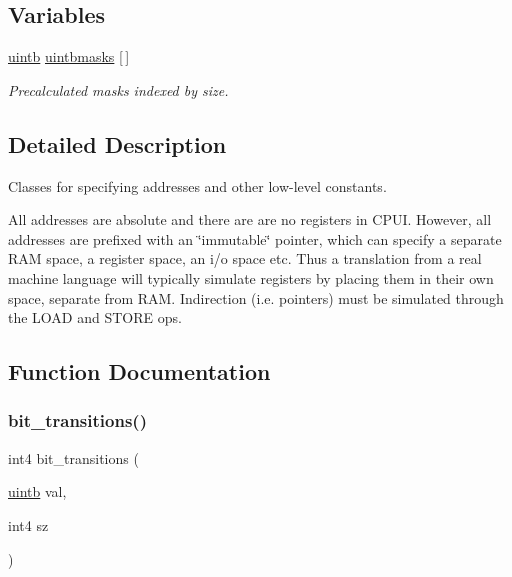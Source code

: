 \subsection*{Variables}
\begin{DoxyCompactItemize}
\item 
\mbox{\hyperlink{types_8h_a2db313c5d32a12b01d26ac9b3bca178f}{uintb}} \mbox{\hyperlink{address_8hh_af65db839ac7c389dab6cba2187c2e867}{uintbmasks}} \mbox{[}$\,$\mbox{]}
\begin{DoxyCompactList}\small\item\em Precalculated masks indexed by size. \end{DoxyCompactList}\end{DoxyCompactItemize}


\subsection{Detailed Description}
Classes for specifying addresses and other low-\/level constants. 

All addresses are absolute and there are are no registers in C\+P\+UI. However, all addresses are prefixed with an \char`\"{}immutable\char`\"{} pointer, which can specify a separate R\+AM space, a register space, an i/o space etc. Thus a translation from a real machine language will typically simulate registers by placing them in their own space, separate from R\+AM. Indirection (i.\+e. pointers) must be simulated through the L\+O\+AD and S\+T\+O\+RE ops. 

\subsection{Function Documentation}
\mbox{\label{address_8hh_a9971349a0c8643a0f9d1211f2e6aa3c0}} 
\subsubsection{\texorpdfstring{bit\_transitions()}{bit\_transitions()}}
{\footnotesize\ttfamily int4 bit\+\_\+transitions (\begin{DoxyParamCaption}\item[{\mbox{\hyperlink{types_8h_a2db313c5d32a12b01d26ac9b3bca178f}{uintb}}}]{val,  }\item[{int4}]{sz }\end{DoxyParamCaption})}



